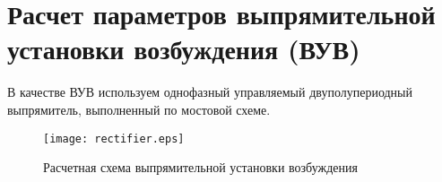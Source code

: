 \chapter{Расчет параметров выпрямительной установки возбуждения (ВУВ)}

В качестве ВУВ используем однофазный управляемый двуполупериодный выпрямитель, выполненный по мостовой схеме.

\begin{figure}[H]
    \centering    
    \texttt{[image: rectifier.eps]}
    \caption{Расчетная схема выпрямительной установки возбуждения}
    \label{fig:vuv}
\end{figure}
